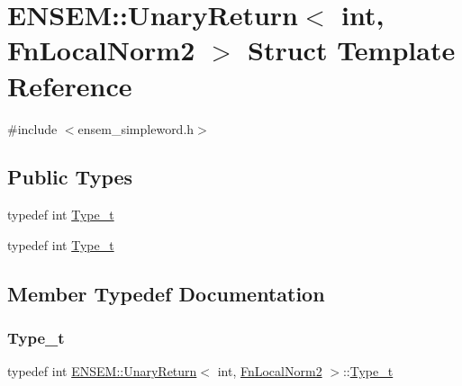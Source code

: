 \hypertarget{structENSEM_1_1UnaryReturn_3_01int_00_01FnLocalNorm2_01_4}{}\section{E\+N\+S\+EM\+:\+:Unary\+Return$<$ int, Fn\+Local\+Norm2 $>$ Struct Template Reference}
\label{structENSEM_1_1UnaryReturn_3_01int_00_01FnLocalNorm2_01_4}


{\ttfamily \#include $<$ensem\+\_\+simpleword.\+h$>$}

\subsection*{Public Types}
\begin{DoxyCompactItemize}
\item 
typedef int \mbox{\hyperlink{structENSEM_1_1UnaryReturn_3_01int_00_01FnLocalNorm2_01_4_aaa78b86bca8291361ec04d107d900df8}{Type\+\_\+t}}
\item 
typedef int \mbox{\hyperlink{structENSEM_1_1UnaryReturn_3_01int_00_01FnLocalNorm2_01_4_aaa78b86bca8291361ec04d107d900df8}{Type\+\_\+t}}
\end{DoxyCompactItemize}


\subsection{Member Typedef Documentation}
\mbox{\label{structENSEM_1_1UnaryReturn_3_01int_00_01FnLocalNorm2_01_4_aaa78b86bca8291361ec04d107d900df8}} 
\subsubsection{\texorpdfstring{Type\_t}{Type\_t}\hspace{0.1cm}{\footnotesize\ttfamily [1/2]}}
{\footnotesize\ttfamily typedef int \mbox{\hyperlink{structENSEM_1_1UnaryReturn}{E\+N\+S\+E\+M\+::\+Unary\+Return}}$<$ int, \mbox{\hyperlink{structENSEM_1_1FnLocalNorm2}{Fn\+Local\+Norm2}} $>$\+::\mbox{\hyperlink{structENSEM_1_1UnaryReturn_3_01int_00_01FnLocalNorm2_01_4_aaa78b86bca8291361ec04d107d900df8}{Type\+\_\+t}}}

